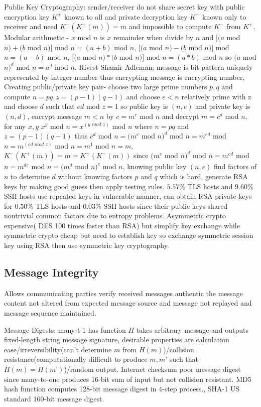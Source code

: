 \documentclass[9pt]{extarticle}
\begin{document}
\begin{multicols}{2}
Public Key Cryptography: sender/receiver do not share secret key with public encryption key $K^+$ known to all and private decryption key $K^-$ known only to receiver and need $K^-(K^+(m))=m$ and impossible to compute $K^-$ from $K^+$. Modular arithmetic - $x$ mod $n$ is $x$ remainder when divide by $n$ and $[(a$ mod $n)+(b$ mod $n)]$ mod $n=(a+b)$ mod $n$, $[(a$ mod $n)-(b$ mod $n)]$ mod $n=(a-b)$ mod $n$, $[(a$ mod $n)*(b$ mod $n)]$ mod $n=(a*b)$ mod $n$ so $(a$ mod $n)^d$ mod $n=a^d$ mod $n$. Rivest Shamir Adleman: message is bit pattern uniquely represented by integer number thus encrypting message is encrypting number,  Creating public/private key pair- choose two large prime numbers $p,q$ and compute $n=pq,z =(p-1)(q-1)$ and choose $e<n$ relatively prime with z and choose $d$ such that $ed$ mod $z=1$ so public key is $(n,e)$ and  private key is $(n,d)$, encrypt message $m<n$ by $c=m^e$ mod $n$ and decrypt $m=c^d$ mod $n$, for any $x,y$ $x^y$ mod $n =x^{(y\textit{ mod }z)}$ mod $n$ where $n=pq$ and $z=(p-1)(q-1)$ thus $c^d$ mod $n=(m^e$ mod $n)^d$ mod $n=m^{ed}$ mod $n=m^{(ed\textit{ mod }z)}$ mod $n=m^1$ mod $n=m$, $K^-(K^+(m))=m=K^+(K^-(m))$ since $(m^e$ mod $n)^d$ mod $n=m^{ed}$ mod $n=m^{de}$ mod $n=(m^d$ mod $n)^e$ mod $n$, knowing public key $(n,e)$ find factors of $n$ to determine $d$ without knowing factors $p$ and $q$ which is hard, generate RSA keys by making good guess then apply testing rules. $5.57\%$ TLS hosts and $9.60\%$ SSH hosts use repeated keys in vulnerable manner, can obtain RSA private keys for $0.50\%$ TLS hosts and $0.03\%$ SSH hosts since their public keys shared nontrivial
common factors due to entropy problems. Asymmetric crypto expensive( DES 100 times faster than RSA) but simplify key exchange while symmetric crypto cheap but need to establish key so exchange symmetric session key using RSA then use symmetric key cryptography. 

\subsection{Message Integrity}

Allows communicating parties verify received messages authentic the message content not altered from expected message source and message not replayed and message sequence maintained.

Message Digests: many-t-1 has function $H$ takes arbitrary message and outputs fixed-length string message signature, desirable properties are calculation ease/irreversibility(can’t determine $m$ from $H(m)$)/collision resistance(computationally difficult to produce $m,m’$ such that $H(m)=H(m’)$)/random output. Internet checksum poor message digest since many-to-one produces 16-bit sum of input but not collision resistant. MD5 hash function computes 128-bit message digest in 4-step process., SHA-1 US standard 160-bit message digest. 


\end{multicols}
\end{document}
